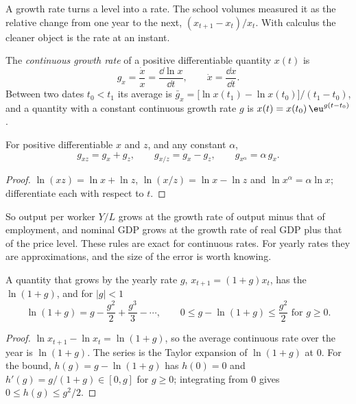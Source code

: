 A growth rate turns a level into a rate. The school volumes measured it as
the relative change from one year to the next, $(x_{t+1} - x_t)/x_t$. With
calculus the cleaner object is the rate at an instant.

\begin{definition}\label{def:b1:models-and-data:growth-rate}
The \emph{continuous growth rate} of a positive differentiable quantity
$x(t)$ is
\[
g_x = \frac{\dot x}{x} = \frac{\dd \ln x}{\dd t}, \qquad \dot x = \frac{\dd x}{\dd t}.
\]
Between two dates $t_0 < t_1$ its average is
$\bar g_x = \bigl[\ln x(t_1) - \ln x(t_0)\bigr]/(t_1 - t_0)$, and a quantity
with a constant continuous growth rate $g$ is $x(t) = x(t_0)\,\eu^{g(t - t_0)}$.
\end{definition}

\begin{proposition}\label{prop:b1:models-and-data:product}
For positive differentiable $x$ and $z$, and any constant $\alpha$,
\[
g_{xz} = g_x + g_z, \qquad g_{x/z} = g_x - g_z, \qquad g_{x^\alpha} = \alpha\, g_x .
\]
\end{proposition}

\begin{proof}
$\ln(xz) = \ln x + \ln z$, $\ln(x/z) = \ln x - \ln z$ and
$\ln x^\alpha = \alpha \ln x$; differentiate each with respect to $t$.
\end{proof}

So output per worker $Y/L$ grows at the growth rate of output minus that of
employment, and nominal GDP grows at the growth rate of real GDP plus that
of the price level. These rules are exact for continuous rates. For yearly
rates they are approximations, and the size of the error is worth knowing.

\begin{proposition}\label{prop:b1:models-and-data:log-approx}
A quantity that grows by the yearly rate $g$, $x_{t+1} = (1 + g)x_t$, has
the  $\ln(1 + g)$, and for $|g| < 1$
\[
\ln(1 + g) = g - \frac{g^2}{2} + \frac{g^3}{3} - \dotsb ,
\qquad 0 \le g - \ln(1 + g) \le \frac{g^2}{2} \text{ for } g \ge 0 .
\]
\end{proposition}

\begin{proof}
$\ln x_{t+1} - \ln x_t = \ln(1 + g)$, so the average continuous rate over
the year is $\ln(1 + g)$. The series is the Taylor expansion of $\ln(1 + g)$
at $0$. For the bound, $h(g) = g - \ln(1 + g)$ has $h(0) = 0$ and
$h'(g) = g/(1 + g) \in [0, g]$ for $g \ge 0$; integrating from $0$ gives
$0 \le h(g) \le g^2/2$.
\end{proof}

